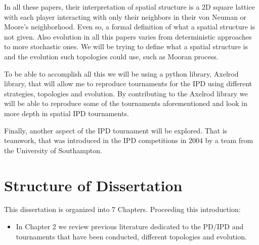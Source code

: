 In all these papers, their interpretation of spatial structure is a 2D square lattice with
each player interacting with only their neighbors in their von Neuman or Moore's
neighborhood. Even so, a formal definition of what a spatial
structure is not given. Also evolution in all this papers varies from deterministic
approaches to more stochastic ones. We will be trying to define what a spatial structure
is and the evolution such topologies could use, such as Mooran process.

To be able to accomplish all this we will be using a python library, Axelrod library,
that will allow me to reproduce tournaments for the IPD using different strategies,
topologies and evolution. By contributing to the Axelrod library we will be able
to reproduce some of the tournaments aforementioned and look in more depth in spatial
IPD tournaments.

Finally, another aspect of the IPD tournament will be explored. That is teamwork, that
was introduced in the IPD competitions in 2004 by a team from the University of Southampton.

\section{Structure of Dissertation}
This dissertation is organized into 7 Chapters. Proceeding this introduction:
\begin{itemize}
  \item In Chapter 2 we review previous literature dedicated to the PD/IPD
        and tournaments that have been conducted, different topologies and evolution.
\end{itemize}
